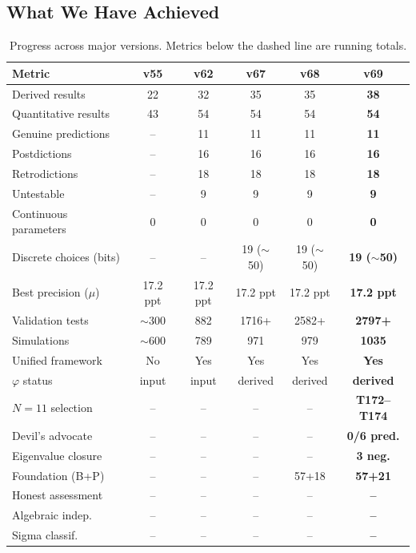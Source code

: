 \documentclass[aps,prd,twocolumn,superscriptaddress,floatfix,nofootinbib]{revtex4-2}
\theoremstyle{definition}
\theoremstyle{remark}
\newcommand{\vp}{\varphi}
\begin{document}
\subsection{What We Have Achieved}

\begin{table}[ht]
\centering
\caption{Progress across major versions. Metrics below the dashed line are running totals.}
\label{tab:progress}
\begin{tabular}{lccccc}
\toprule
Metric & v55 & v62 & v67 & v68 & \textbf{v69} \\
\midrule
Derived results & 22 & 32 & 35 & 35 & \textbf{38} \\
Quantitative results & 43 & 54 & 54 & 54 & \textbf{54} \\
\quad Genuine predictions & -- & 11 & 11 & 11 & \textbf{11} \\
\quad Postdictions & -- & 16 & 16 & 16 & \textbf{16} \\
\quad Retrodictions & -- & 18 & 18 & 18 & \textbf{18} \\
\quad Untestable & -- & 9 & 9 & 9 & \textbf{9} \\
Continuous parameters & 0 & 0 & 0 & 0 & \textbf{0} \\
Discrete choices (bits) & -- & -- & 19 ($\sim$50) & 19 ($\sim$50) & \textbf{19 ($\sim$50)} \\
Best precision ($\mu$) & 17.2 ppt & 17.2 ppt & 17.2 ppt & 17.2 ppt & \textbf{17.2 ppt} \\
Validation tests & $\sim$300 & 882 & 1716+ & 2582+ & \textbf{2797+} \\
Simulations & $\sim$600 & 789 & 971 & 979 & \textbf{1035} \\
Unified framework & No & Yes & Yes & Yes & \textbf{Yes} \\
$\vp$ status & input & input & derived & derived & \textbf{derived} \\
$N{=}11$ selection & -- & -- & -- & -- & \textbf{T172--T174} \\
Devil's advocate & -- & -- & -- & -- & \textbf{0/6 pred.} \\
Eigenvalue closure & -- & -- & -- & -- & \textbf{3 neg.} \\
Foundation (B+P) & -- & -- & -- & 57+18 & \textbf{57+21} \\
Honest assessment & -- & -- & -- & -- & \textbf{--} \\
Algebraic indep. & -- & -- & -- & -- & \textbf{--} \\
Sigma classif. & -- & -- & -- & -- & \textbf{--} \\

\end{tabular}
\end{table}
\end{document}
